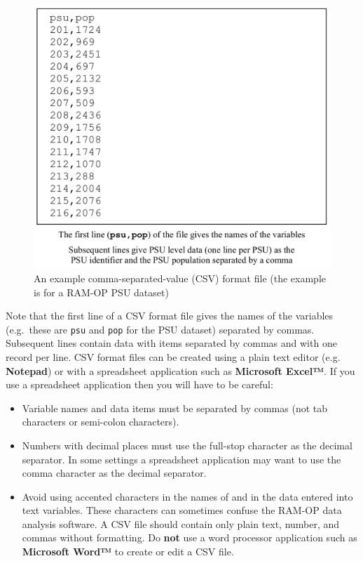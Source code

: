\documentclass[12pt,a4paper]{book}
\theoremstyle{definition}
\theoremstyle{definition}
\theoremstyle{definition}
\theoremstyle{remark}
\begin{document}
\begin{figure}[H]

{\centering \includegraphics{figures/dataset02} 

}

\caption{An example comma-separated-value (CSV) format file (the example is for a RAM-OP PSU dataset)}\label{fig:dataset02}
\end{figure}

Note that the first line of a CSV format file gives the names of the
variables (e.g.~these are \texttt{psu} and \texttt{pop} for the PSU
dataset) separated by commas. Subsequent lines contain data with items
separated by commas and with one record per line. CSV format files can
be created using a plain text editor (e.g. \textbf{Notepad}) or with a
spreadsheet application such as \textbf{Microsoft Excel™}. If you use a
spreadsheet application then you will have to be careful:

\begin{itemize}
\item
  Variable names and data items must be separated by commas (not tab
  characters or semi-colon characters).
\item
  Numbers with decimal places must use the full-stop character as the
  decimal separator. In some settings a spreadsheet application may want
  to use the comma character as the decimal separator.
\item
  Avoid using accented characters in the names of and in the data
  entered into text variables. These characters can sometimes confuse
  the RAM-OP data analysis software. A CSV file should contain only
  plain text, number, and commas without formatting. Do \textbf{not} use
  a word processor application such as \textbf{Microsoft Word™} to
  create or edit a CSV file.
\end{itemize}
\end{document}
